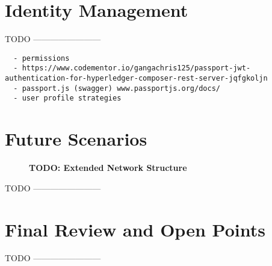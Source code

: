 \section{Identity Management}
\label{sec:id-management}

TODO ------------------------

\begin{verbatim}
  - permissions
  - https://www.codementor.io/gangachris125/passport-jwt-authentication-for-hyperledger-composer-rest-server-jqfgkoljn
  - passport.js (swagger) www.passportjs.org/docs/
  - user profile strategies
\end{verbatim}

\section{Future Scenarios}
\label{sec:future-scene}

\begin{figure}[htbp]
  \centering
  \caption{\bf\small TODO: Extended Network Structure}
  \label{fig:prototype-net-ext}
\end{figure}

TODO ------------------------

\section{Final Review and Open Points}

TODO ------------------------